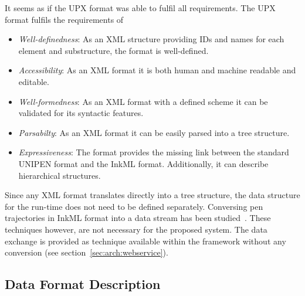 It seems as if the UPX format was able to fulfil all requirements.
The UPX format fulfils the requirements of
\begin{itemize}
  \item \emph{Well-definedness}: As an XML structure providing IDs and names for 
        each element and substructure, the format is well-defined.

  \item \emph{Accessibility}: As an XML format it is both human and machine
        readable and editable.

  \item \emph{Well-formedness}: As an XML format with a defined scheme it can
        be validated for its syntactic features.

  \item \emph{Parsabilty}: As an XML format it can be easily parsed into a
        tree structure.

  \item \emph{Expressiveness}: The format provides the missing link between the
        standard UNIPEN format and the InkML format. Additionally, it can 
        describe hierarchical structures.
\end{itemize}
Since any XML format translates directly into a tree structure, the data 
structure for the run-time does not need to be defined separately.
Conversing pen trajectories in InkML format into a data stream has been 
studied~. These techniques however, are not necessary 
for the proposed system. The data exchange is provided as technique available
within the framework without any conversion (see 
section~\ref{sec:arch:webservice}).

\subsection{Data Format Description}
\label{sec:hwre:dataformatdescription}




